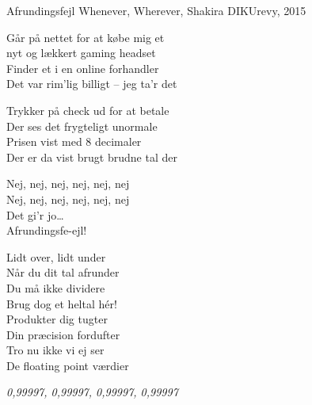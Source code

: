 \begin{song}{Afrundingsfejl}
  {} %
  {Whenever, Wherever, Shakira} %
  {} %
  {DIKUrevy, 2015} %
  {\NotCCLIed} %

  \begin{SBVerse}
    Går på nettet for at købe mig et\\
    nyt og lækkert gaming headset\\
    Finder et i en online forhandler\\
    Det var rim'lig billigt -- jeg ta'r det
  \end{SBVerse}

  \begin{SBVerse}
    Trykker på check ud for at betale\\
    Der ses det frygteligt unormale\\
    Prisen vist med 8 decimaler\\
    Der er da vist brugt brudne tal der
  \end{SBVerse}

  \begin{SBSection*}
    Nej, nej, nej, nej, nej, nej\\
    Nej, nej, nej, nej, nej, nej\\
    Det gi'r jo\ldots\\
    Afrundingsfe-ejl!
  \end{SBSection*}

  \begin{SBChorus}
    Lidt over, lidt under\\
    Når du dit tal afrunder\\
    Du må ikke dividere\\
    Brug dog et heltal hér!\\
    \medskip
    Produkter dig tugter\\
    Din præcision fordufter\\
    Tro nu ikke vi ej ser\\
    De floating point værdier
  \end{SBChorus}

  \begin{SBSection*}
    \emph{0,99997, 0,99997, 0,99997, 0,99997}
  \end{SBSection*}


\end{song}
